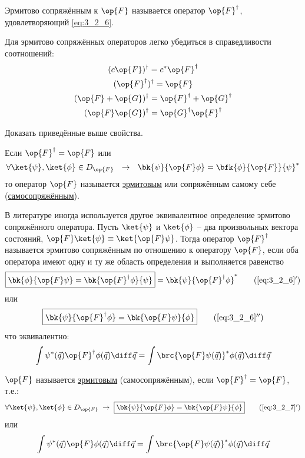 \begin{defn}
Эрмитово сопряжённым к $\op{F}$ называется оператор $\op{F}^\dag$, удовлетворяющий \eqref{eq:3_2_6}.
\end{defn}

Для эрмитово сопряжённых операторов легко убедиться в справедливости соотношений:
$$
\begin{gathered}
(c\op{F})^\dag = c^* \op{F}^\dag \\
(\op{F}^\dag)^\dag = \op{F} \\
(\op{F} + \op{G})^\dag = \op{F}^\dag + \op{G}^\dag \\
(\op{F}\op{G})^\dag = \op{G}^\dag \op{F}^\dag
\end{gathered}
$$

\begin{excr}
Доказать приведённые выше свойства.
\end{excr}

\begin{defn}
Если $\op{F}^\dag = \op{F}$ или
\begin{equation}
\label{eq:3_2_7}
\forall \ket{\psi},\ket{\phi} \in D_{\op{F}} ~~\to~~
  \bk{\psi}{\op{F}\phi} = \bfk{\phi}{\op{F}}{\psi}^*
\end{equation}
то оператор $\op{F}$ называется \underline{эрмитовым} или сопряжённым самому себе (\underline{самосопряжённым}).
\end{defn}

В литературе иногда используется другое эквивалентное определение эрмитово сопряжённого оператора. Пусть $\ket{\psi}$ и $\ket{\phi}$ -- два произвольных вектора состояний, $\op{F}\ket{\psi} \equiv \ket{\op{F}\psi}$. Тогда оператор $\op{F}^\dag$ называется эрмитово сопряжённым по отношению к оператору $\op{F}$, если оба оператора имеют одну и ту же область определения и выполняется равенство
\begin{equation}
\label{eq:3_2_6_add}
\boxed{
	\bk{\phi}{\op{F}\psi} = \bk{\op{F}^\dag\phi}{\psi}
} = \bk{\psi}{\op{F}^\dag \phi}^*
\tag{\ref{eq:3_2_6}$'$}
\end{equation}
или
\begin{equation}
\label{eq:3_2_6_add_x2}
\boxed{
	\bk{\psi}{\op{F}^\dag \phi} = \bk{\op{F} \psi}{\phi}
}
\tag{\ref{eq:3_2_6}$''$}
\end{equation}
что эквивалентно:
$$
\int \psi^*(\vec{q}) \op{F}^\dag \phi(\vec{q})\diff\vec{q}
  = \int \brc{\op{F} \psi(\vec{q})}^* \phi(\vec{q})\diff\vec{q}
$$

\begin{defn}
$\op{F}$ называется \underline{эрмитовым} (самосопряжённым), если $\op{F}^\dag = \op{F}$, т.е.:
\begin{equation}
\label{eq:3_2_7_add}
\forall \ket{\psi}, \ket{\phi} \in D_{\op{F}}  ~\to~ \boxed{ \bk{\psi}{\op{F} \phi} = \bk{\op{F}\psi}{\phi} }
\tag{\ref{eq:3_2_7}$'$}
\end{equation}
или
$$
\int \psi^*(\vec{q}) \op{F} \phi(\vec{q})\diff\vec{q}
  = \int \brc{\op{F} \psi(\vec{q})}^* \phi(\vec{q})\diff\vec{q}
$$
\end{defn}

